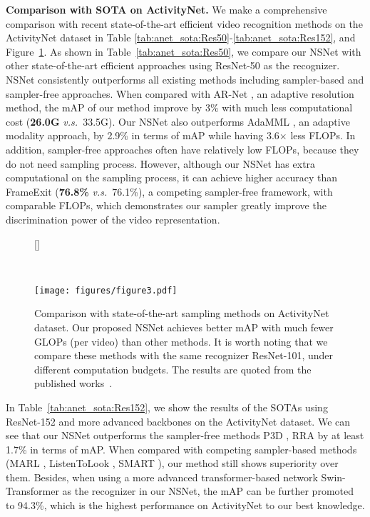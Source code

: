 \documentclass[runningheads]{llncs}
\newcommand{\figref}[1]{Figure~\ref{#1}}
\newcommand{\tabref}[1]{Table~\ref{#1}}
\def\vs{\emph{v.s.~}}
\begin{document}
\noindent\textbf{Comparison with SOTA on ActivityNet.}
We make a comprehensive comparison with recent state-of-the-art efficient video recognition methods on the ActivityNet dataset in Table \ref{tab:anet_sota:Res50}-\ref{tab:anet_sota:Res152}, and \figref{fig:anet_res101}. 
As shown in \tabref{tab:anet_sota:Res50}, we compare our NSNet with other state-of-the-art efficient approaches using ResNet-50 as the recognizer. NSNet consistently outperforms all existing methods including sampler-based and sampler-free approaches.
When compared with AR-Net \cite{arnet}, an adaptive resolution method, the mAP of our method improve by 3\% with much less computational cost (\textbf{26.0G} \vs 33.5G). Our NSNet also outperforms AdaMML \cite{adamml}, an adaptive modality approach, by 2.9\% in terms of mAP while having 3.6$\times$ less FLOPs. In addition, sampler-free approaches often have relatively low FLOPs, because they do not need sampling process.
However, although our NSNet has extra computational on the sampling process, it can achieve higher accuracy than FrameExit \cite{frameexit}(\textbf{76.8\%} \vs 76.1\%), a competing sampler-free framework, with comparable FLOPs, which demonstrates our sampler greatly improve the discrimination power of the video representation. 
\begin{figure}[h]
[\FBwidth]
{\caption{Comparison with state-of-the-art sampling methods on ActivityNet dataset. 
Our proposed NSNet achieves better mAP with much fewer GLOPs (per video) than other methods. It is worth noting that we compare these methods with the same recognizer ResNet-101, under different computation budgets. The results are quoted from the published works~\cite{listentolook,arnet}.}~\label{fig:anet_res101}
      }
{\texttt{[image: figures/figure3.pdf]}}
\end{figure}
In \tabref{tab:anet_sota:Res152}, we show the results of the SOTAs using ResNet-152 and more advanced backbones on the ActivityNet dataset. We can see that our NSNet outperforms the sampler-free methods P3D \cite{p3d}, RRA \cite{rra} by at least 1.7\% in terms of mAP. When compared with competing sampler-based methods (MARL \cite{marl}, ListenToLook \cite{listentolook}, SMART \cite{smart2020}), our method still shows superiority over them. Besides, when using a more advanced transformer-based network Swin-Transformer \cite{swintransformer} as the recognizer in our NSNet, the mAP can be further promoted to 94.3\%, which is the highest performance on ActivityNet to our best knowledge.
 
\end{document}
